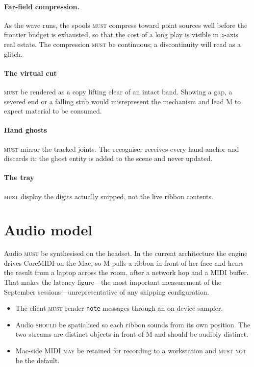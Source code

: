 \documentclass[11pt,a4paper]{article}
\newcommand{\MUST}{\textsc{must}}
\newcommand{\MUSTNOT}{\textsc{must not}}
\newcommand{\SHOULD}{\textsc{should}}
\newcommand{\MAY}{\textsc{may}}
\theoremstyle{definition}
\theoremstyle{plain}
\theoremstyle{remark}
\begin{document}
\paragraph{Far-field compression.} As the wave runs, the spools \MUST{} compress toward point
sources well before the frontier budget is exhausted, so that the cost of a long play is visible
in $z$-axis real estate. The compression \MUST{} be continuous; a discontinuity will read as a
glitch.

\paragraph{The virtual cut} \MUST{} be rendered as a copy lifting clear of an intact band. Showing
a gap, a severed end or a falling stub would misrepresent the mechanism and lead M to expect
material to be consumed.

\paragraph{Hand ghosts} \MUST{} mirror the tracked joints. The recogniser receives every hand anchor
and discards it; the ghost entity is added to the scene and never updated.

\paragraph{The tray} \MUST{} display the digits actually snipped, not the live ribbon contents.

\section{Audio model}

Audio \MUST{} be synthesised on the headset. In the current architecture the engine drives CoreMIDI
on the Mac, so M pulls a ribbon in front of her face and hears the result from a laptop across the
room, after a network hop and a MIDI buffer. That makes the latency figure---the most important
measurement of the September sessions---unrepresentative of any shipping configuration.

\begin{itemize}[leftmargin=*]
\item The client \MUST{} render \texttt{note} messages through an on-device sampler.
\item Audio \SHOULD{} be spatialised so each ribbon sounds from its own position. The two streams
      are distinct objects in front of M and should be audibly distinct.
\item Mac-side MIDI \MAY{} be retained for recording to a workstation and \MUSTNOT{} be the default.
\end{itemize}
\end{document}
